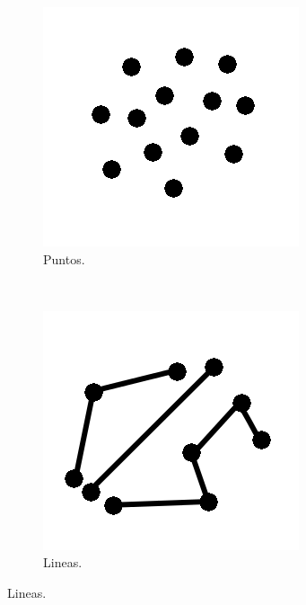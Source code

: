 \begin{figure}[!htbp]
    \centering
    \begin{subfigure}[b]{0.3\textwidth}
            \includegraphics[width=\textwidth]{capitulo-2/graphics/datos-puntuales.png}
            \caption{Puntos.}
    \end{subfigure}
    ~~~~
    \begin{subfigure}[b]{0.3\textwidth}
            \includegraphics[width=\textwidth]{capitulo-2/graphics/datos-lineales.png}
            \caption{Lineas.}


\end{subfigure}
\end{figure}
